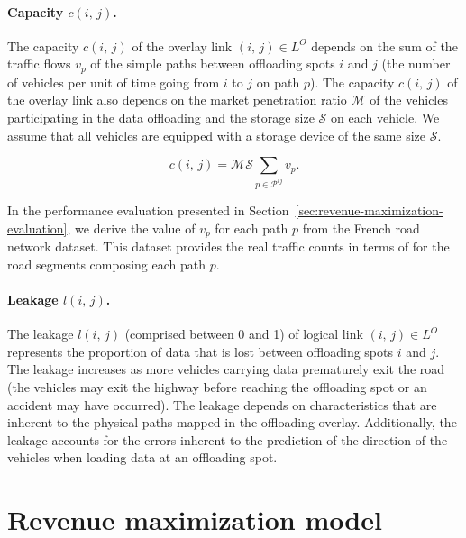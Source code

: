 \paragraph{Capacity $c(i,\,j)$.}
The capacity $c(i,\,j)$ of the overlay link $(i,\,j)\in L^{O}$ depends on the sum of the traffic flows $v_{p}$ of the simple paths between offloading spots $i$ and $j$ (\ie the number of vehicles per unit of time going from $i$ to $j$ on path $p$). The capacity $c(i,\,j)$ of the overlay link also depends on the market penetration ratio $\mathcal{M}$ of the vehicles participating in the data offloading and the storage size $\mathcal{S}$ on each vehicle. We assume that all vehicles are equipped with a storage device of the same size $\mathcal{S}$.

\begin{equation}
  c(i,\,j) = \mathcal{M} \mathcal{S} \sum_{p\in \mathcal{P}^{ij}} v_{p}.
\end{equation}

In the performance evaluation presented in Section~\ref{sec:revenue-maximization-evaluation}, we derive the value of $v_{p}$ for each path $p$ from the French road network dataset. This dataset provides the real traffic counts in terms of  for the road segments composing each path $p$.

\paragraph{Leakage $l(i,\,j)$.}
The leakage $l(i,\,j)$ (comprised between 0 and 1) of logical link $(i,\,j)\in L^{O}$ represents the proportion of data that is lost between offloading spots $i$ and $j$. The leakage increases as more vehicles carrying data prematurely exit the road (\eg the vehicles may exit the highway before reaching the offloading spot or an accident may have occurred). The leakage depends on characteristics that are inherent to the physical paths mapped in the offloading overlay. Additionally, the leakage accounts for the errors inherent to the prediction of the direction of the vehicles when loading data at an offloading spot.

\section{Revenue maximization model}
\label{sec:revenue-maximization-model}

